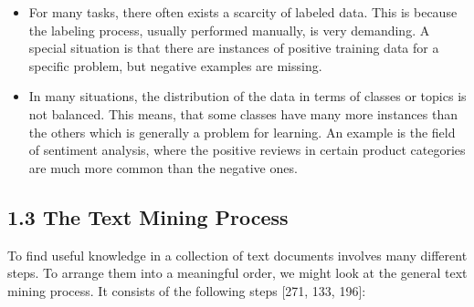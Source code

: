 \documentclass[10pt]{book}
\begin{document}
\begin{itemize}
  \item For many tasks, there often exists a scarcity of labeled data. This is because the labeling process, usually performed manually, is very demanding. A special situation is that there are instances of positive training data for a specific problem, but negative examples are missing.
  \item In many situations, the distribution of the data in terms of classes or topics is not balanced. This means, that some classes have many more instances than the others which is generally a problem for learning. An example is the field of sentiment analysis, where the positive reviews in certain product categories are much more common than the negative ones.
\end{itemize}

\subsection*{1.3 The Text Mining Process}
To find useful knowledge in a collection of text documents involves many different steps. To arrange them into a meaningful order, we might look at the general text mining process. It consists of the following steps [271, 133, 196]:
\end{document}
